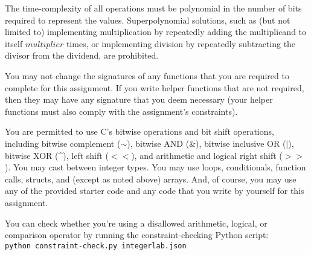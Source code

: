 The time-complexity of all operations must be polynomial in the number of bits required to represent the values.
Superpolynomial solutions, such as (but not limited to) implementing multiplication by repeatedly adding the multiplicand to itself $multiplier$ times, or implementing division by repeatedly subtracting the divisor from the dividend, are prohibited.

You may not change the signatures of any functions that you are required to complete for this assignment.
If you write helper functions that are not required, then they may have any signature that you deem necessary
(your helper functions must also comply with the assignment's constraints).

You are permitted to use C's bitwise operations and bit shift operations, including bitwise complement ($\sim$), bitwise AND (\&), bitwise inclusive OR ($|$), bitwise XOR (\^{}), left shift ($<<$), and arithmetic and logical right shift ($>>$).
You may cast between integer types.
You may use loops, conditionals, function calls, structs, and (except as noted above) arrays.
And, of course, you may use any of the provided starter code and any code that you write by yourself for this assignment.

You can check whether you're using a disallowed arithmetic, logical, or comparison operator by running the constraint-checking Python script: \\
\texttt{python constraint-check.py integerlab.json}



